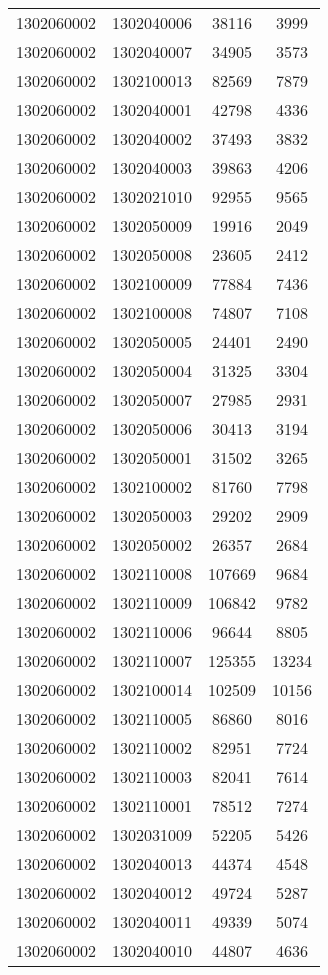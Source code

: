\begin{longtable}{llcc}
1302060002 & 1302040006 & 38116 & 3999\\
1302060002 & 1302040007 & 34905 & 3573\\
1302060002 & 1302100013 & 82569 & 7879\\
1302060002 & 1302040001 & 42798 & 4336\\
1302060002 & 1302040002 & 37493 & 3832\\
1302060002 & 1302040003 & 39863 & 4206\\
1302060002 & 1302021010 & 92955 & 9565\\
1302060002 & 1302050009 & 19916 & 2049\\
1302060002 & 1302050008 & 23605 & 2412\\
1302060002 & 1302100009 & 77884 & 7436\\
1302060002 & 1302100008 & 74807 & 7108\\
1302060002 & 1302050005 & 24401 & 2490\\
1302060002 & 1302050004 & 31325 & 3304\\
1302060002 & 1302050007 & 27985 & 2931\\
1302060002 & 1302050006 & 30413 & 3194\\
1302060002 & 1302050001 & 31502 & 3265\\
1302060002 & 1302100002 & 81760 & 7798\\
1302060002 & 1302050003 & 29202 & 2909\\
1302060002 & 1302050002 & 26357 & 2684\\
1302060002 & 1302110008 & 107669 & 9684\\
1302060002 & 1302110009 & 106842 & 9782\\
1302060002 & 1302110006 & 96644 & 8805\\
1302060002 & 1302110007 & 125355 & 13234\\
1302060002 & 1302100014 & 102509 & 10156\\
1302060002 & 1302110005 & 86860 & 8016\\
1302060002 & 1302110002 & 82951 & 7724\\
1302060002 & 1302110003 & 82041 & 7614\\
1302060002 & 1302110001 & 78512 & 7274\\
1302060002 & 1302031009 & 52205 & 5426\\
1302060002 & 1302040013 & 44374 & 4548\\
1302060002 & 1302040012 & 49724 & 5287\\
1302060002 & 1302040011 & 49339 & 5074\\
1302060002 & 1302040010 & 44807 & 4636\\

\end{longtable}
